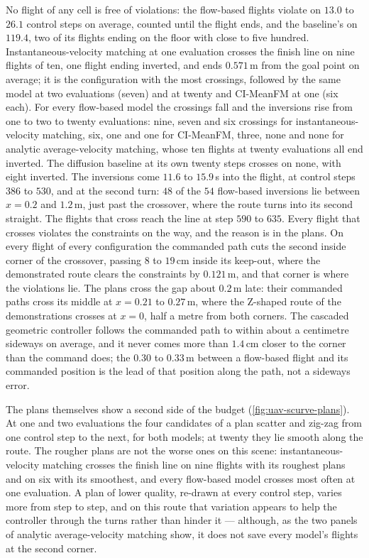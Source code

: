 No flight of any cell is free of violations: the flow-based flights violate on $13.0$ to $26.1$ control
steps on average, counted until the flight ends, and the baseline's on $119.4$, two of its flights ending on
the floor with close to five hundred. Instantaneous-velocity matching at one evaluation
crosses the finish line on nine flights of ten, one flight ending inverted, and ends $0.571$\,m from the
goal point on average; it is the configuration with the most crossings, followed by the same model at two
evaluations (seven) and at twenty and CI-MeanFM at one (six each). For every flow-based model the crossings
fall and the inversions rise from one to two to twenty evaluations: nine, seven and six crossings for
instantaneous-velocity matching, six, one and one for CI-MeanFM, three, none and none for analytic
average-velocity matching, whose ten flights at twenty evaluations all end inverted. The diffusion baseline
at its own twenty steps crosses on none, with eight inverted. The inversions come $11.6$ to $15.9$\,s into the
flight, at control steps $386$ to $530$, and at the second turn: $48$ of the $54$ flow-based inversions lie
between $x=0.2$ and $1.2$\,m, just past the crossover, where the route turns into its second straight. The
flights that cross reach the line at step $590$ to $635$. Every flight that crosses violates the constraints
on the way, and the reason is in the plans. On every flight of every configuration the commanded path cuts
the second inside corner of the crossover, passing $8$ to $19$\,cm inside its keep-out, where the
demonstrated route clears the constraints by $0.121$\,m, and that corner is where the violations lie. The plans
cross the gap about $0.2$\,m late: their commanded paths cross its middle at $x=0.21$ to $0.27$\,m, where the
Z-shaped route of the demonstrations crosses at $x=0$, half a metre from both corners. The
cascaded geometric controller follows the commanded path to within about a centimetre sideways on average,
and it never comes more than $1.4$\,cm closer to the corner than the command does; the $0.30$ to $0.33$\,m
between a flow-based flight and its commanded position is the lead of that position along the path, not a
sideways error.

The plans themselves show a second side of the budget (\autoref{fig:uav-scurve-plans}). At one and two
evaluations the four candidates of a plan scatter and zig-zag from one control step to the next, for both
models; at twenty they lie smooth along the route. The rougher plans are not the worse ones on this scene:
instantaneous-velocity matching crosses the finish line on nine flights with its roughest plans and on six
with its smoothest, and every flow-based model crosses most often at one evaluation. A plan of lower quality,
re-drawn at every control step, varies more from step to step, and on this route that variation appears to
help the controller through the turns rather than hinder it --- although, as the two panels of analytic
average-velocity matching show, it does not save every model's flights at the second corner.

